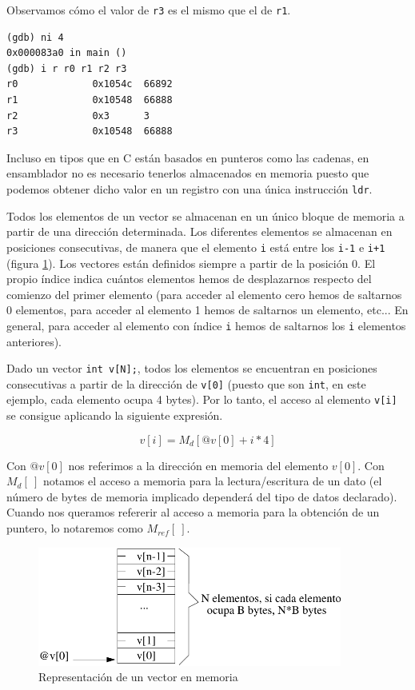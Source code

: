 Observamos cómo el valor de {\tt r3} es el mismo que el de {\tt r1}.

\begin{lstlisting}
(gdb) ni 4
0x000083a0 in main ()
(gdb) i r r0 r1 r2 r3
r0             0x1054c  66892
r1             0x10548  66888
r2             0x3      3
r3             0x10548  66888
\end{lstlisting}

Incluso en tipos que en C están basados en punteros como las cadenas,
en ensamblador no es necesario tenerlos almacenados en memoria puesto
que podemos obtener dicho valor en un registro con una única instrucción {\tt ldr}.

\vspace{0.25cm}
 Todos los elementos de un vector se almacenan en un único
bloque de memoria a partir de una dirección determinada. Los
diferentes elementos se almacenan en posiciones consecutivas, de
manera que el elemento {\tt i}  está entre los {\tt i-1} e {\tt i+1}
(figura \ref{fig:dos_3}). Los
vectores están definidos siempre a partir de la posición 0. El propio
índice indica cuántos elementos hemos de desplazarnos respecto del
comienzo del primer elemento (para acceder al elemento cero hemos de
saltarnos 0 elementos, para acceder al elemento 1 hemos de saltarnos
un elemento, etc... En general, para acceder al elemento con índice
{\tt i}
hemos de saltarnos los {\tt i} elementos anteriores).

Dado un vector {\tt int v[N];}, todos los elementos se encuentran en posiciones
consecutivas a partir de la dirección de {\tt v[0]}
(puesto que son {\tt int}, en este ejemplo, cada elemento ocupa 4 bytes). Por lo tanto,
el acceso al elemento {\tt v[i]} se consigue aplicando la siguiente expresión.

\begin{equation}
v[i] = M_d[@v[0] + i*4] 
\label{eq:uno}
\end{equation}

Con $ @v[0]$ nos referimos a la dirección en memoria del elemento
 $ v[0]$. Con $ M_d[\ ]$ notamos el acceso a memoria para la lectura/escritura
de un dato (el número de bytes de memoria implicado dependerá del tipo
de datos declarado). Cuando nos queramos refererir al acceso a memoria
para la obtención de un puntero, lo notaremos como
$ M_{ref}[\ ]$.

\begin{figure}[h]
  \centering
    \includegraphics[width=10cm]{graphs/2-3.pdf}
  \caption{Representación de un vector en memoria}
  \label{fig:dos_3}
\end{figure}


